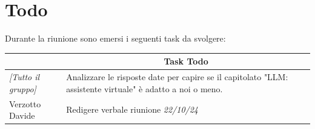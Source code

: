 \section{Todo}

Durante la riunione sono emersi i seguenti task da svolgere:

\vspace{0.5cm}

\begin{table}[htbp]
\begin{tabular}{|p{}|p{}|}
    \hline
    \rowcolor[gray]{0.9}
    \multicolumn{1}{|c|}{\textbf{Assegnatario}} & \multicolumn{1}{|c|}{\textbf{Task Todo}} \\
    \hline
    \emph{[Tutto il gruppo]} & Analizzare le risposte date per capire se il
capitolato "LLM: assistente virtuale" è adatto a noi o meno.  \\
    \hline
    Verzotto Davide & Redigere verbale riunione \emph{22/10/24} \\
    \hline
\end{tabular}
\end{table}


